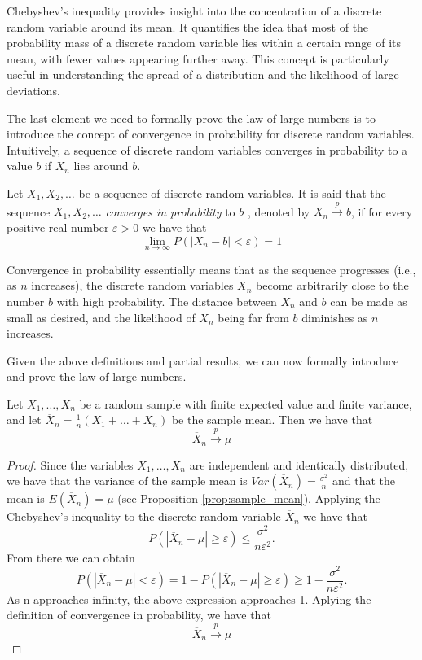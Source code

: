 Chebyshev's inequality provides insight into the concentration of a discrete random variable around its mean. It quantifies the idea that most of the probability mass of a discrete random variable lies within a certain range of its mean, with fewer values appearing further away. This concept is particularly useful in understanding the spread of a distribution and the likelihood of large deviations.

The last element we need to formally prove the law of large numbers is to introduce the concept of convergence in probability for discrete random variables. Intuitively, a sequence of discrete random variables converges in probability to a value $b$ if $X_n$ lies around $b$.

\begin{definition}
Let $X_{1}, X_{2}, \ldots$ be a sequence of discrete random variables. It is said that the sequence $X_{1}, X_{2}, \ldots$ \emph{converges in probability} to $b$ , denoted by $X_{n} \overset{p}{\rightarrow}b$, if for every positive real number $\varepsilon>0$ we have that
\[
\lim_{n \rightarrow \infty} P \left( \left| X_{n} - b \right| < \varepsilon \right) = 1
\]
\end{definition}

Convergence in probability essentially means that as the sequence progresses (i.e., as $n$ increases), the discrete random variables $X_n$ become arbitrarily close to the number $b$ with high probability. The distance between $X_n$ and $b$ can be made as small as desired, and the likelihood of $X_n$ being far from $b$ diminishes as $n$ increases.

Given the above definitions and partial results, we can now formally introduce and prove the law of large numbers.

\begin{theorem}
\label{th:law_large_numbers}
Let $X_1, \ldots, X_n$ be a random sample with finite expected value and finite variance, and let $\overline {X}_n = \frac {1}{n} \left( X_1 + \ldots + X_n \right)$ be the sample mean. Then we have that
\[
\overline {X}_n \overset{p}{\rightarrow} \mu
\]
\end{theorem}
\begin{proof}
Since the variables $X_1, \ldots, X_n$ are independent and identically distributed, we have that the variance of the sample mean is $Var \left( \overline {X}_n \right) = \frac{\sigma^2}{n}$ and that the mean is $E \left( \overline {X}_n \right) = \mu$ (see Proposition \ref{prop:sample_mean}). Applying the Chebyshev's inequality to the discrete random variable $\overline {X}_n$ we have that
\[
P \left( \left| \overline {X}_n- \mu \right| \geq \varepsilon \right) \leq \frac{\sigma ^2}{n \varepsilon^2}.
\]
From there we can obtain
\[
P \left( \left| \overline {X}_n - \mu \right| < \varepsilon \right) = 1 - P \left( \left| \overline {X}_n - \mu \right| \geq \varepsilon \right) \geq 1 - \frac{\sigma ^2}{n \varepsilon^2}.
\]
As n approaches infinity, the above expression approaches 1. Aplying the definition of convergence in probability, we have that
\[
\overline{X}_n \overset{p}{\rightarrow} \mu
\]
\end{proof}


